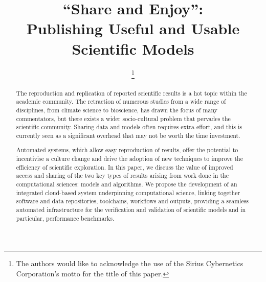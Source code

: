 \documentclass[conference]{IEEEtran}
\begin{document}

\title{``Share and Enjoy'':\\Publishing Useful and Usable Scientific Models}

\author{
%
\thanks{The authors would like to acknowledge the use of the Sirius Cybernetics
  Corporation's motto for the title of this paper. }
\and
{}
}

\maketitle

\begin{abstract}
The reproduction and replication of reported scientific results is a
hot topic within the academic community. The retraction of numerous
studies from a wide range of disciplines, from climate science to
bioscience, has drawn the focus of many commentators, but there exists
a wider socio-cultural problem that pervades the scientific community.
Sharing data and models often requires extra effort, and this is
currently seen as a significant overhead that may not be worth the
time investment.

Automated systems, which allow easy reproduction of results, offer the
potential to incentivise a culture change and drive the adoption of
new techniques to improve the efficiency of scientific exploration. In
this paper, we discuss the value of improved access and sharing of the
two key types of results arising from work done in the computational
sciences: models and algorithms. We propose the development of an
integrated cloud-based system underpinning computational science,
linking together software and data repositories, toolchains, workflows
and outputs, providing a seamless automated infrastructure for the
verification and validation of scientific models and in particular,
performance benchmarks.
\end{abstract}
\end{document}
